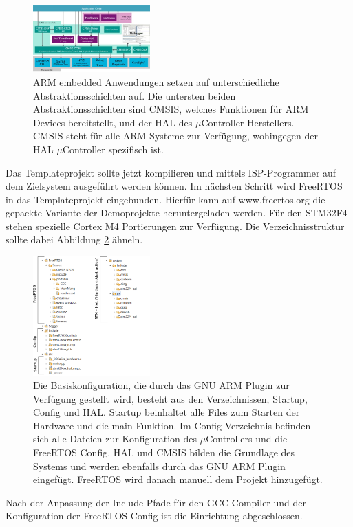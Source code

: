 \begin{figure}[htb]
	\centering
		\includegraphics[width=0.4\textwidth]{Pictures/Einrichtung/CMSISv4_small.jpg}
	\caption{ARM embedded Anwendungen setzen auf unterschiedliche Abstraktionsschichten auf. Die untersten beiden Abstraktionsschichten sind CMSIS, welches Funktionen für ARM Devices bereitstellt, und der HAL des $\mu$Controller Herstellers. CMSIS steht für alle ARM Systeme zur Verfügung, wohingegen der HAL $\mu$Controller spezifisch ist. }
	\label{fig:CMSIS}
\end{figure}
Das Templateprojekt sollte jetzt kompilieren und mittels ISP-Programmer auf dem Zielsystem ausgeführt werden können.
Im nächsten Schritt wird  \mbox{FreeRTOS} in das Templateprojekt eingebunden. Hierfür kann auf www.freertos.org die gepackte Variante der Demoprojekte heruntergeladen werden. Für den STM32F4 stehen spezielle Cortex M4 Portierungen zur Verfügung. Die Verzeichnisstruktur sollte dabei Abbildung \ref{fig:SourceTree} ähneln.
\begin{figure}[htb]
	\centering
		\includegraphics[width=0.4\textwidth]{Pictures/Einrichtung/sourceTree.png}
	\caption{Die Basiskonfiguration, die durch das GNU ARM Plugin zur Verfügung gestellt wird, besteht aus den Verzeichnissen,  Startup, Config und HAL. Startup beinhaltet alle Files zum Starten der Hardware und die main-Funktion. Im Config Verzeichnis befinden sich alle Dateien zur Konfiguration des $\mu$Controllers und die FreeRTOS Config. HAL und CMSIS bilden die Grundlage des Systems und werden ebenfalls durch das GNU ARM Plugin eingefügt. FreeRTOS wird danach manuell dem Projekt hinzugefügt.}
	\label{fig:SourceTree}
\end{figure}
Nach der Anpassung der Include-Pfade für den GCC Compiler und der Konfiguration der FreeRTOS Config ist die Einrichtung abgeschlossen.
